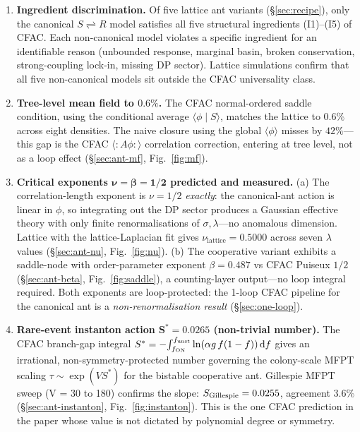 \documentclass[10pt,a4paper,twocolumn]{article}
\newcommand{\dd}{\mathrm{d}}
\newcommand{\avg}[1]{\langle #1 \rangle}
\theoremstyle{definition}
\begin{document}
\begin{enumerate}
  \item \textbf{Ingredient discrimination.}  Of five lattice ant
    variants (\S\ref{sec:recipe}), only the canonical
    $S\rightleftharpoons R$ model satisfies all five structural
    ingredients (I1)--(I5) of CFAC.  Each non-canonical model
    violates a specific ingredient for an identifiable reason
    (unbounded response, marginal basin, broken conservation,
    strong-coupling lock-in, missing DP sector).  Lattice
    simulations confirm that all five non-canonical models sit
    outside the CFAC universality class.

  \item \textbf{Tree-level mean field to $\boldsymbol{0.6\%}$.}
    The CFAC normal-ordered saddle condition, using the
    conditional average $\avg{\phi\mid S}$, matches the lattice
    to $0.6\%$ across eight densities.  The naive closure using
    the global $\avg\phi$ misses by $42\%$---this gap is the
    CFAC $\avg{:\!A\phi\!:}$ correlation correction, entering at
    tree level, not as a loop effect (\S\ref{sec:ant-mf},
    Fig.~\ref{fig:mf}).

  \item \textbf{Critical exponents $\boldsymbol{\nu = \beta = 1/2}$ predicted and measured.}
    (a) The correlation-length exponent is $\nu = 1/2$
    \emph{exactly}: the canonical-ant action is linear in
    $\phi$, so integrating out the DP sector produces a Gaussian
    effective theory with only finite renormalisations of
    $\sigma,\lambda$---no anomalous dimension.  Lattice with
    the lattice-Laplacian fit gives $\nu_{\text{lattice}} =
    0.5000$ across seven $\lambda$ values
    (\S\ref{sec:ant-nu}, Fig.~\ref{fig:nu}).
    (b) The cooperative variant exhibits a saddle-node with
    order-parameter exponent $\beta = 0.487$ vs CFAC
    Puiseux $1/2$ (\S\ref{sec:ant-beta}, Fig.~\ref{fig:saddle}),
    a counting-layer output---no loop integral required.
    Both exponents are loop-protected: the 1-loop CFAC pipeline
    for the canonical ant is a \emph{non-renormalisation result}
    (\S\ref{sec:one-loop}).

  \item \textbf{Rare-event instanton action
    $\boldsymbol{S^* = 0.0265}$ (non-trivial number).}
    The CFAC branch-gap integral
    $S^* = -\!\int_{f_{\rm ON}}^{f_{\rm unst}} \ln(\alpha g\,f(1-f))\,\dd f$
    gives an irrational, non-symmetry-protected number governing
    the colony-scale MFPT scaling $\tau \sim \exp(V S^*)$ for
    the bistable cooperative ant.  Gillespie MFPT sweep
    (V = 30 to 180) confirms the slope:
    $S_{\rm Gillespie} = 0.0255$, agreement $\mathbf{3.6\%}$
    (\S\ref{sec:ant-instanton}, Fig.~\ref{fig:instanton}).
    This is the one CFAC prediction in the paper whose value is
    not dictated by polynomial degree or symmetry.


\end{enumerate}
\end{document}

